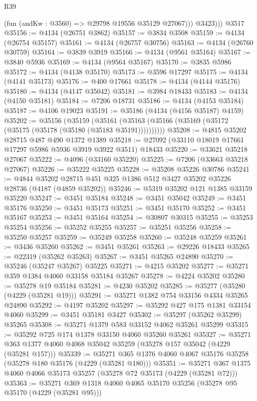 \begin{lexlean}{R39}
\begin{coremodule}
            (fun (andKw : @3560) => @29798 @19556 @35129 @27067)))
          @3423)))
    @3517
@35156 := @4134 (@26751 @3862)
@35157 := @3834 @3508
@35159 := @4134 (@26754 @35157)
@35161 := @4134 (@26757 @30756)
@35163 := @4134 (@26760 @30759)
@35164 := @3839 @3919
@35166 := @4134 (@9561 @35164)
@35167 := @3840 @5936
@35169 := @4134 (@9564 @35167)
@35170 := @3835 @5986
@35172 := @4134 (@4138 @35170)
@35173 := @3596 @17297
@35175 := @4134 (@4141 @35173)
@35176 := @400 @17661
@35178 := @4134 (@4144 @35176)
@35180 := @4134 (@4147 @35042)
@35181 := @3984 @18433
@35183 := @4134 (@4150 @35181)
@35184 := @7206 @18731
@35186 := @4134 (@4153 @35184)
@35187 := @4106 @19023
@35191 := @35186 (@4134 (@4156 @35187) @4159)
@35202 := @35156
    (@35159 (@35161 (@35163 (@35166 (@35169 (@35172 (@35175 (@35178 (@35180 (@35183 @35191))))))))))
@35208 := @4815 @35202 @28715 @487 @490 @1372 @1389
@35218 := @27092 (@33110 @18019 @17661 @17297 @5986 @5936 @3919 @3922 @3511) @18433
@35220 := @33621 @35218 @27067
@35222 := @4096 (@33160 @35220)
@35225 := @7206 (@33663 @35218 @27067)
@35226 := @35222 @35225
@35228 := @35208 @35226 @30786
@35241 := @4844 @35202 @28715 @451 @325 @1386 @512 @3427 @35202 @35226 @28736 (@4187 (@4859 @35202))
@35246 := @5319 @35202 @121 @1385 @33159 @35220
@35247 := @3451 @35184
@35248 := @3451 @35042
@35249 := @3451 @35176
@35250 := @3451 @35173
@35251 := @3451 @35170
@35252 := @3451 @35167
@35253 := @3451 @35164
@35254 := @30807 @30315
@35255 := @35253 @35254
@35256 := @35252 @35255
@35257 := @35251 @35256
@35258 := @35250 @35257
@35259 := @35249 @35258
@35260 := @35248 @35259
@35261 := @3436 @35260
@35262 := @3451 @35261
@35263 := @29226 @18433
@35265 := @22319 (@35262 @35263)
@35267 := @3451 @35265 @24890
@35270 := @35246 (@35247 @35267) @35225
@35271 := @4215 @35202
@35277 := @35271 @359 @1384 @4060 @33158 @35184 @35267
@35278 := @4224 @35202
@35280 := @35278 @19 @35184
@35281 := @4230 @35202
@35285 := @35277 (@35280 (@4229 (@35281 @19)))
@35291 := @35271 @1382 @754 @33156 @4334 @35265 @24890
@35292 := @4197 @35202
@35297 := @35292 @427 @175 @1381 @33154 @4060
@35299 := @3451 @35181 @3427
@35302 := @35297 (@35262 @35299) @35265
@35308 := @35271 @1379 @583 @33152 @4062 @35261 @35299
@35315 := @35292 @725 @174 @1378 @33150 @4060 @35260 @35261
@35327 := @35271 @363 @1377 @4060 @4068 @35042 @35259 (@35278 @157 @35042 (@4229 (@35281 @157)))
@35339 := @35271 @365 @1376 @4060 @4067 @35176 @35258 (@35278 @180 @35176 (@4229 (@35281 @180)))
@35351 := @35271 @367 @1375 @4060 @4066 @35173 @35257 (@35278 @72 @35173 (@4229 (@35281 @72)))
@35363 := @35271 @369 @1318 @4060 @4065 @35170 @35256 (@35278 @95 @35170 (@4229 (@35281 @95)))

\end{coremodule}
\end{lexlean}
